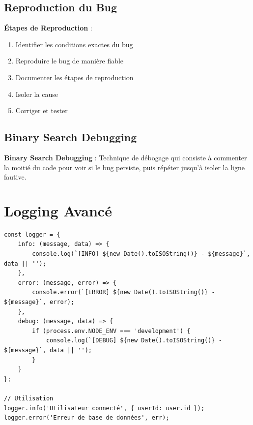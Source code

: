 \subsection{Reproduction du Bug}

\begin{bestpracticebox}
    \textbf{Étapes de Reproduction} :
    \begin{enumerate}
        \item Identifier les conditions exactes du bug
        \item Reproduire le bug de manière fiable
        \item Documenter les étapes de reproduction
        \item Isoler la cause
        \item Corriger et tester
    \end{enumerate}
\end{bestpracticebox}

\subsection{Binary Search Debugging}

\begin{definitionbox}
    \textbf{Binary Search Debugging} : Technique de débogage qui consiste à commenter la moitié du code pour voir si le bug persiste, puis répéter jusqu'à isoler la ligne fautive.
\end{definitionbox}

\section{Logging Avancé}

\begin{lstlisting}[style=javascript, caption=Logging structuré]
const logger = {
    info: (message, data) => {
        console.log(`[INFO] ${new Date().toISOString()} - ${message}`, data || '');
    },
    error: (message, error) => {
        console.error(`[ERROR] ${new Date().toISOString()} - ${message}`, error);
    },
    debug: (message, data) => {
        if (process.env.NODE_ENV === 'development') {
            console.log(`[DEBUG] ${new Date().toISOString()} - ${message}`, data || '');
        }
    }
};

// Utilisation
logger.info('Utilisateur connecté', { userId: user.id });
logger.error('Erreur de base de données', err);
\end{lstlisting}

